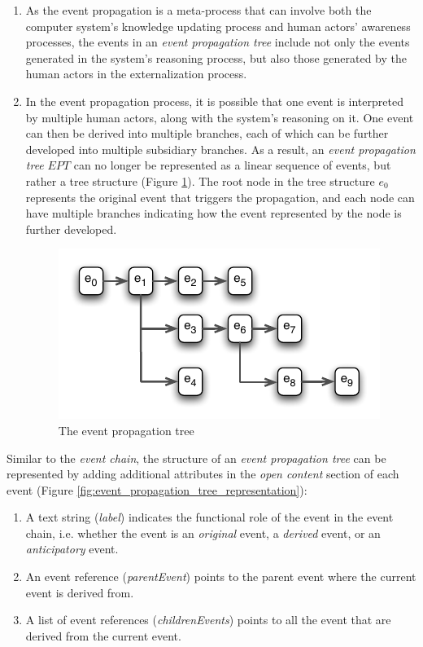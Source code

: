 \begin{enumerate}
	\item As the event propagation is a meta-process that can involve both the computer system's knowledge updating process and human actors' awareness processes, the events in an \emph{event propagation tree} include not only the events generated in the system's reasoning process, but also those generated by the human actors in the externalization process.
	\item In the event propagation process, it is possible that one event is interpreted by multiple human actors, along with the system's reasoning on it. One event can then be derived into multiple branches, each of which can be further developed into multiple subsidiary branches. As a result, an \emph{event propagation tree} $EPT$ can no longer be represented as a linear sequence of events, but rather a tree structure (Figure \ref{fig:event_propagation_tree}). The root node in the tree structure $e_0$ represents the original event that triggers the propagation, and each node can have multiple branches indicating how the event represented by the node is further developed.
	\begin{figure}[htbp] %
		\centering
		\includegraphics{event_propagation_tree.pdf} 
		\caption{The event propagation tree}
		\label{fig:event_propagation_tree}
	\end{figure}
\end{enumerate}

Similar to the \emph{event chain}, the structure of an \emph{event propagation tree} can be represented by adding additional attributes in the \emph{open content} section of each event (Figure \ref{fig:event_propagation_tree_representation}): 
\begin{enumerate}
 	\item A text string (\emph{label}) indicates the functional role of the event in the event chain, i.e. whether the event is an \emph{original} event, a \emph{derived} event, or an \emph{anticipatory} event.
 	\item An event reference (\emph{parentEvent}) points to the parent event where the current event is derived from. 
 	\item A list of event references (\emph{childrenEvents}) points to all the event that are derived from the current event.
 \end{enumerate} 

